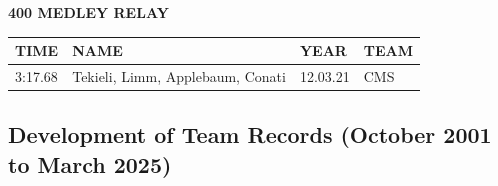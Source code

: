 \begin{table}[H]
\centering
\begin{minipage}[t]{0.6\textwidth}
\centering
\textbf{400 MEDLEY RELAY}\\[0.1cm]
\begin{tabular}{@{}p{1.8cm}p{2.8cm}p{1.2cm}p{1.4cm}@{}}
\hline
    \textbf{TIME} & \textbf{NAME} & \textbf{YEAR} & \textbf{TEAM} \\
\hline
    3:17.68 & Tekieli, Limm, Applebaum, Conati & 12.03.21 & CMS \\
\hline
\end{tabular}
\end{minipage}
\end{table}


\newpage



\subsection{Development of Team Records (October 2001 to March 2025)}


